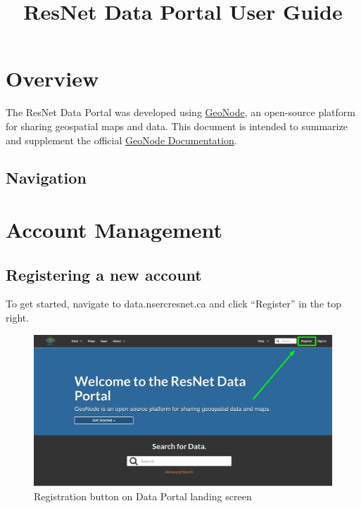 \documentclass[
]{book}
\title{ResNet Data Portal User Guide}
\author{}
\date{\vspace{-2.5em}}
\begin{document}
\maketitle

{
\setcounter{tocdepth}{1}
\tableofcontents
}
\hypertarget{overview}{%
\chapter{Overview}\label{overview}}

The ResNet Data Portal was developed using \href{https://geonode.org/}{GeoNode}, an open-source platform for sharing geospatial maps and data. This document is intended to summarize and supplement the official \href{https://docs.geonode.org/en/3.2.x/usage/index.html}{GeoNode Documentation}.

\hypertarget{navigation}{%
\section{Navigation}\label{navigation}}

\hypertarget{intro}{%
\chapter{Account Management}\label{intro}}

\hypertarget{registering-a-new-account}{%
\section{Registering a new account}\label{registering-a-new-account}}

To get started, navigate to data.nsercresnet.ca and click ``Register'' in the top right.

\begin{figure}
\centering
\includegraphics{images/paste-B29D8E77.png}
\caption{Registration button on Data Portal landing screen}
\end{figure}
\end{document}
